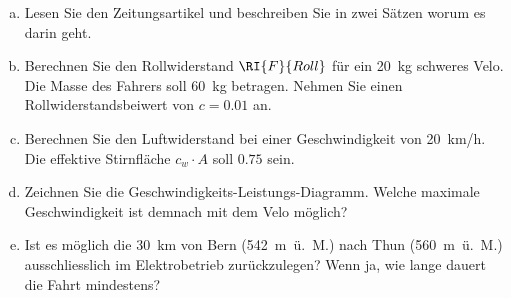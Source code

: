 

\begin{aufgabe}
	\begin{enumerate} [a)]
		\item	Lesen Sie den Zeitungsartikel und beschreiben Sie in zwei Sätzen worum es darin geht.
		\item Berechnen Sie den Rollwiderstand $\RI{F}{Roll}$ für ein \SI{20}{kg} schweres Velo.
			Die Masse des Fahrers soll \SI{60}{kg} betragen.
			Nehmen Sie einen Rollwiderstandsbeiwert von $c=0.01$ an.
		\item Berechnen Sie den Luftwiderstand bei einer Geschwindigkeit von \SI{20}{km/h}. Die effektive
			Stirnfläche $c_w\cdot A$ soll $\num{0.75}$ sein.
		\item Zeichnen Sie die Geschwindigkeits-Leistungs-Diagramm. Welche maximale Geschwindigkeit ist demnach mit dem Velo möglich?
		\item Ist es möglich die \SI{30}{km} von Bern (542\ m\ ü.\ M.) nach Thun (560\ m\ ü.\ M.) ausschliesslich im Elektrobetrieb zurückzulegen?
			Wenn ja, wie lange dauert die Fahrt mindestens?
	\end{enumerate}
\end{aufgabe}
